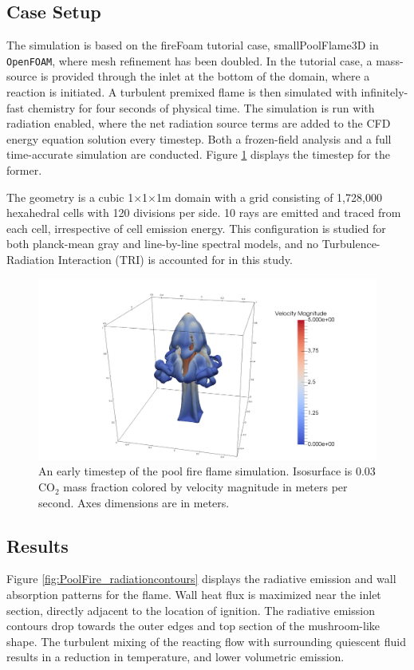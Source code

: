 \subsection{Case Setup}
The simulation is based on the fireFoam tutorial case, smallPoolFlame3D in \verb|OpenFOAM|, where mesh refinement has been doubled. 
In the tutorial case, a mass-source is provided through the inlet at the bottom of the domain, where a reaction is initiated. A turbulent premixed flame is then simulated with infinitely-fast chemistry for four seconds of physical time.
The simulation is run with radiation enabled, where the net radiation source terms are added to the CFD energy equation solution every timestep.
Both a frozen-field analysis and a full time-accurate simulation are conducted. Figure \ref{fig:PoolFire_diagram} displays the timestep for the former.

The geometry is a cubic 1$\times$1$\times$1m domain with a grid consisting of 1,728,000 hexahedral cells with 120 divisions per side.
10 rays are emitted and traced from each cell, irrespective of cell emission energy.
This configuration is studied for both planck-mean gray and line-by-line spectral models, and no Turbulence-Radiation Interaction (TRI) is accounted for in this study.

\begin{figure}
\includegraphics[width=\linewidth]{figures/ch4/contour_early.png}
\caption{An early timestep of the pool fire flame simulation. Isosurface is 0.03 CO$_2$ mass fraction colored by velocity magnitude in meters per second. Axes dimensions are in meters.}
\label{fig:PoolFire_diagram}
\end{figure}

\subsection{Results}
Figure \ref{fig:PoolFire_radiationcontours} displays the radiative emission and wall absorption patterns for the flame. Wall heat flux is maximized near the inlet section, directly adjacent to the location of ignition. 
The radiative emission contours drop towards the outer edges and top section of the mushroom-like shape. The turbulent mixing of the reacting flow with surrounding quiescent fluid results in a reduction in temperature, and lower volumetric emission.  

